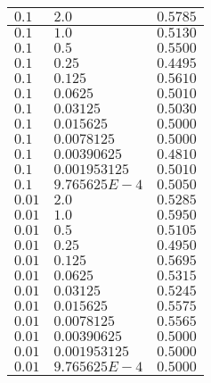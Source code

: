 \begin{enumerate}
\begin{longtable}{| p{}  |  p{} |p{}  |}
      $0.1$ & $2.0$ & $0.5785$ \\
      \hline
      $0.1$ & $1.0$ & $0.5130$ \\
      \hline
      $0.1$ & $0.5$ & $0.5500$ \\
      \hline
      $0.1$ & $0.25$ & $0.4495$ \\
      \hline
      $0.1$ & $0.125$ & $0.5610$ \\
      \hline
      $0.1$ & $0.0625$ & $0.5010$ \\
      \hline
      $0.1$ & $0.03125$ & $0.5030$ \\
      \hline
      $0.1$ & $0.015625$ & $0.5000$ \\
      \hline
      $0.1$ & $0.0078125$ & $0.5000$ \\
      \hline
      $0.1$ & $0.00390625$ & $0.4810$ \\
      \hline
      $0.1$ & $0.001953125$ & $0.5010$ \\
      \hline
      $0.1$ & $9.765625E-4$ & $0.5050$ \\
      \hline
      
      $0.01$ & $2.0$ & $0.5285$ \\
      \hline
      $0.01$ & $1.0$ & $0.5950$ \\
      \hline
      $0.01$ & $0.5$ & $0.5105$ \\
      \hline
      $0.01$ & $0.25$ & $0.4950$ \\
      \hline
      $0.01$ & $0.125$ & $0.5695$ \\
      \hline
      $0.01$ & $0.0625$ & $0.5315$ \\
      \hline
      $0.01$ & $0.03125$ & $0.5245$ \\
      \hline
      $0.01$ & $0.015625$ & $0.5575$ \\
      \hline
      $0.01$ & $0.0078125$ & $0.5565$ \\
      \hline
      $0.01$ & $0.00390625$ & $0.5000$ \\
      \hline
      $0.01$ & $0.001953125$ & $0.5000$ \\
      \hline
      $0.01$ & $9.765625E-4$ & $0.5000$ \\
      \hline
       

\end{longtable}
\end{enumerate}
